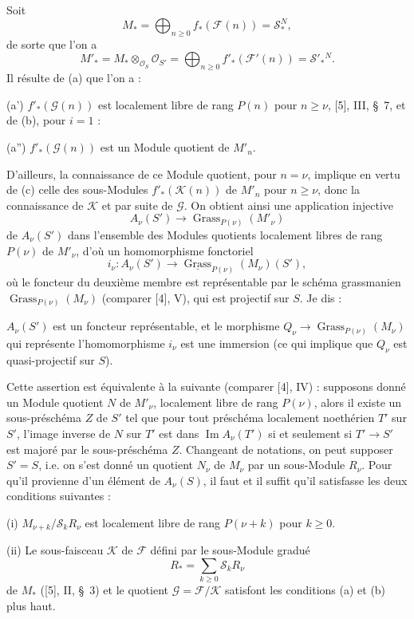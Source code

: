 Soit
\[
M_* =\bigoplus_{n\geq0}f_*(\mathcal F(n))=\mathcal S_*^{N},
\]
de sorte que l'on a
\[
M'_* =M_*\otimes_{\mathcal O_S}\mathcal O_{S'}
=\bigoplus_{n\geq0}f'_*(\mathcal F'(n))=\mathcal S'_*{}^{N}.
\]
Il résulte de (a) que l'on a :

\noindent (a') $f'_*(\mathcal G(n))$ est localement libre de rang $P(n)$ pour
$n\geq\nu$, [5], III, \S~7, et de (b), pour $i=1$ :

\noindent (a'') $f'_*(\mathcal G(n))$ est un Module quotient de $M'_n$.

D'ailleurs, la connaissance de ce Module quotient, pour $n=\nu$, implique en
vertu de (c) celle des sous-Modules $f'_*(\mathcal K(n))$ de $M'_n$ pour
$n\geq\nu$, donc la connaissance de $\mathcal K$ et par suite de $\mathcal G$.
On obtient ainsi une application injective
\[
A_\nu(S')\longrightarrow\operatorname{Grass}_{P(\nu)}(M'_\nu)
\]
de $A_\nu(S')$ dans l'ensemble des Modules quotients localement libres de rang
$P(\nu)$ de $M'_\nu$, d'où un homomorphisme fonctoriel
\[
i_\nu:A_\nu(S')\longrightarrow
\underline{\operatorname{Grass}}_{P(\nu)}(M_\nu)(S'),
\]
où le foncteur du deuxième membre est représentable par le schéma grassmanien
$\operatorname{Grass}_{P(\nu)}(M_\nu)$ (comparer [4], V), qui est projectif
sur $S$. Je dis :

 $A_\nu(S')$ est un foncteur représentable, et le morphisme
$Q_\nu\longrightarrow\operatorname{Grass}_{P(\nu)}(M_\nu)$ qui représente
l'homomorphisme $i_\nu$ est une immersion (ce qui implique que $Q_\nu$ est
quasi-projectif sur $S$).

Cette assertion est équivalente à la suivante (comparer [4], IV) : supposons
donné un Module quotient $N$ de $M'_\nu$, localement libre de rang $P(\nu)$,
alors il existe un sous-préschéma $Z$ de $S'$ tel que pour tout préschéma
localement noethérien $T'$
sur $S'$, l'image inverse de $N$ sur $T'$ est dans
$\operatorname{Im}A_\nu(T')$ si et seulement si $T'\longrightarrow S'$ est
majoré par le sous-préschéma $Z$. Changeant de notations, on peut supposer
$S'=S$, i.e. on s'est donné un quotient $N_\nu$ de $M_\nu$ par un sous-Module
$R_\nu$. Pour qu'il provienne d'un élément de $A_\nu(S)$, il faut et il suffit
qu'il satisfasse les deux conditions suivantes :

\medskip
\noindent (i) $M_{\nu+k}/\mathcal S_kR_\nu$ est localement libre de rang
$P(\nu+k)$ pour $k\geq0$.

\smallskip
\noindent (ii) Le sous-faisceau $\mathcal K$ de $\mathcal F$ défini par le
sous-Module gradué
\[
R_* =\sum_{k\geq0}\mathcal S_kR_\nu
\]
de $M_*$ ([5], II, \S~3) et le quotient $\mathcal G=\mathcal F/\mathcal K$
satisfont les conditions (a) et (b) plus haut.


